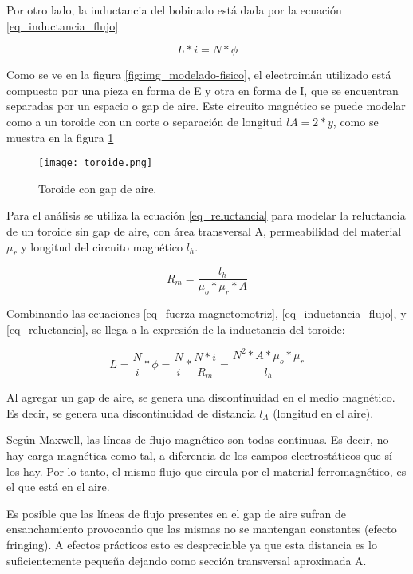 Por otro lado, la inductancia del bobinado está dada por la ecuación \ref{eq_inductancia_flujo}

\begin{equation} \label{eq_inductancia_flujo}
	L*i=N*\phi
\end{equation}


Como se ve en la figura \ref{fig:img_modelado-fisico}, el electroimán utilizado está compuesto por una pieza en forma de E y otra en forma de I, que se encuentran separadas por un espacio o gap de aire. Este circuito magnético se puede modelar como a un toroide con un corte o separación  de longitud $lA=2*y$, como se muestra en la figura \ref{fig:img_toroide}

\begin{figure}[H]
	\centering
	\texttt{[image: toroide.png]}
	\caption{Toroide con gap de aire.}
	\label{fig:img_toroide}
\end{figure}

Para el análisis se utiliza la ecuación \ref{eq_reluctancia} para modelar la reluctancia de un toroide sin gap de aire, con área transversal A, permeabilidad del material $\mu_{r}$ y longitud del circuito magnético $l_{h}$. 

\begin{equation}\label{eq_reluctancia}
	R_{m}=\frac{l_{h}}{\mu_{o}*\mu_{r}*A}
\end{equation}

Combinando las ecuaciones \ref{eq_fuerza-magnetomotriz}, \ref{eq_inductancia_flujo}, y \ref{eq_reluctancia}, se llega a la expresión de la inductancia del toroide:

\begin{equation}\label{eq_inductancia}
	L=\frac{N}{i}*\phi=\frac{N}{i}*\frac{N*i}{R_{m}}=\frac{N^	{2}*A*\mu_{o}*\mu_{r}}{l_{h}}
\end{equation}


Al agregar un gap de aire, se genera una discontinuidad en el medio magnético. Es decir, se genera una discontinuidad de distancia $l_{A}$ (longitud en el aire).

Según Maxwell, las líneas de flujo magnético son todas continuas. Es decir, no hay carga magnética como tal, a diferencia de los campos electrostáticos que sí los hay. Por lo tanto, el mismo flujo que circula por el material ferromagnético, es el que  está en el aire. 

Es posible que las líneas de flujo presentes en el gap de aire sufran de ensanchamiento provocando que las mismas no se mantengan constantes (efecto fringing). A efectos prácticos esto es despreciable ya que esta distancia es lo suficientemente pequeña dejando como sección transversal aproximada A.

